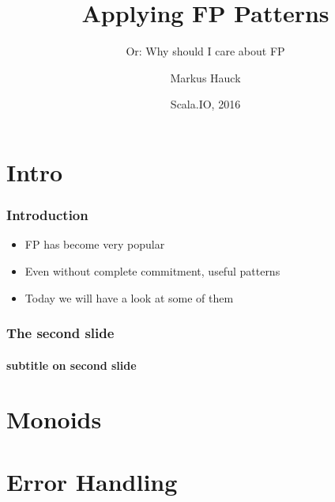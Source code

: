 \documentclass{beamer}
\title{Applying FP Patterns}
\subtitle{Or: Why should I care about FP}
\author{Markus Hauck}
\date{Scala.IO, 2016}
\begin{document}
\frame{\titlepage}

\section{Intro}
\label{sec:intro}

\begin{frame}
  \frametitle{Introduction}
  \begin{itemize}
  \item FP has become very popular
  \item Even without complete commitment, useful patterns
  \item Today we will have a look at some of them
  \end{itemize}
\end{frame}
\begin{frame}
  \frametitle{The second slide}
  \framesubtitle{subtitle on second slide}
\end{frame}


\section{Monoids}
\label{sec:monoids}

\section{Error Handling}
\label{sec:error-handling}
\end{document}
